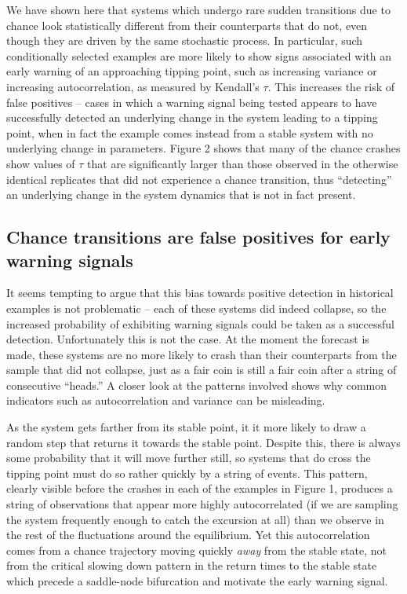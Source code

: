 \documentclass[authoryear,review,12pt]{elsarticle}
\begin{document}
We have shown here that systems which undergo rare sudden transitions
due to chance look statistically different from their counterparts that
do not, even though they are driven by the same stochastic process.
In particular, such conditionally selected examples are more likely to
show signs associated with an early warning of an approaching tipping
point, such as increasing variance or increasing autocorrelation,
as measured by Kendall's $\tau$.  This increases the risk of false
positives -- cases in which a warning signal being tested appears to
have successfully detected an underlying change in the system leading
to a tipping point, when in fact the example comes instead from a stable
system with no underlying change in parameters. Figure 2 shows that many
of the chance crashes show values of $\tau$ that are significantly larger
than those observed in the otherwise identical replicates that did not
experience a chance transition, thus ``detecting'' an underlying change
in the system dynamics that is not in fact present.


\subsection{Chance transitions are false positives for early warning signals}

It seems tempting to argue that this bias towards positive detection in
historical examples is not problematic -- each of these systems did
indeed collapse, so the increased probability of exhibiting warning
signals could be taken as a successful detection.  Unfortunately this
is not the case. At the moment the forecast is made, these systems are
no more likely to crash than their counterparts from the sample that did
not collapse, just as a fair coin is still a fair coin after a string of
consecutive ``heads.''  A closer look at the patterns involved shows why
common indicators such as autocorrelation and variance can be misleading.

As the system gets farther from its stable point, it it more likely to
draw a random step that returns it towards the stable point. Despite
this, there is always some probability that it will move further still,
so systems that do cross the tipping point must do so rather quickly by
a string of events.  This pattern, clearly visible before the crashes
in each of the examples in Figure 1, produces a string of observations
that appear more highly autocorrelated (if we are sampling the system
frequently enough to catch the excursion at all) than we observe in the
rest of the fluctuations around the equilibrium.  Yet this autocorrelation
comes from a chance trajectory moving quickly \emph{away} from the
stable state, not from the critical slowing down pattern in the return
times to the stable state which precede a saddle-node bifurcation and
motivate the early warning signal.
\end{document}
